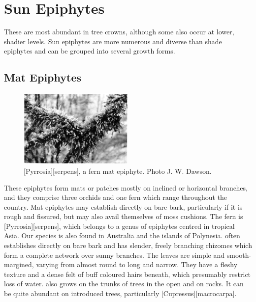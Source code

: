 \section{Sun Epiphytes}

These are most abundant in tree crowns, although some also occur at lower, shadier levels.
Sun epiphytes are more numerous and diverse than shade epiphytes and can be grouped into several growth forms.

\subsection{Mat Epiphytes}

\begin{figure}
	\includegraphics[width=0.5\textwidth]{graphics/figure38pyrrosia.jpg}
	\centering
	\caption[\emph{Pyrrosia serpens}, a fern mat epiphyte]{[Pyrrosia][serpens], a fern mat epiphyte.
	Photo  J. W. Dawson.}%
	\label{fig:38pyrrosia}
\end{figure}

These epiphytes form mats or patches mostly on inclined or horizontal branches, and they comprise three orchids and one fern which range throughout the country.
Mat epiphytes may establish directly on bare bark, particularly if it is rough and fissured, but may also avail themselves of moss cushions.
The fern is [Pyrrosia][serpens], which belongs to a genus of epiphytes centred in tropical Asia.
Our species is also found in Australia and the islands of Polynesia.  often establishes directly on bare bark and has slender, freely branching rhizomes which form a complete network over sunny branches.
The leaves are simple and smooth-margined, varying from almost round to long and narrow.
They have a fleshy texture and a dense felt of buff coloured hairs beneath, which presumably restrict loss of water.  also grows on the trunks of trees in the open and on rocks.
It can be quite abundant on introduced trees, particularly [Cupressus][macrocarpa].

